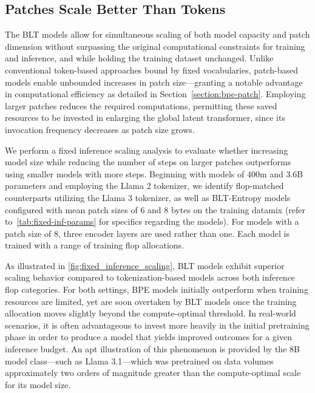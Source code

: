 \subsection{Patches Scale Better Than Tokens} The {\textsc BLT} models allow for simultaneous scaling of both model capacity and patch dimension without surpassing the original computational constraints for training and inference, and while holding the training dataset unchanged. Unlike conventional token-based approaches bound by fixed vocabularies, patch-based models enable unbounded increases in patch size—granting a notable advantage in computational efficiency as detailed in Section~\ref{section:bpe-patch}. Employing larger patches reduces the required computations, permitting these saved resources to be invested in enlarging the global latent transformer, since its invocation frequency decreases as patch size grows.

We perform a fixed inference scaling analysis to evaluate whether increasing model size while reducing the number of steps on larger patches outperforms using smaller models with more steps. Beginning with models of 400m and 3.6B parameters and employing the Llama 2 tokenizer, we identify flop-matched counterparts utilizing the Llama 3 tokenizer, as well as {\textsc BLT}-Entropy models configured with mean patch sizes of 6 and 8 bytes on the training datamix (refer to~\autoref{tab:fixed-inf-params} for specifics regarding the models). For models with a patch size of 8, three encoder layers are used rather than one. Each model is trained with a range of training flop allocations.

As illustrated in \autoref{fig:fixed_inference_scaling}, {\textsc BLT} models exhibit superior scaling behavior compared to tokenization-based models across both inference flop categories. For both settings, BPE models initially outperform when training resources are limited, yet are soon overtaken by {\textsc BLT} models once the training allocation moves slightly beyond the compute-optimal threshold. In real-world scenarios, it is often advantageous to invest more heavily in the initial pretraining phase in order to produce a model that yields improved outcomes for a given inference budget. An apt illustration of this phenomenon is provided by the 8B model class—such as Llama 3.1—which was pretrained on data volumes approximately two orders of magnitude greater than the compute-optimal scale for its model size.

